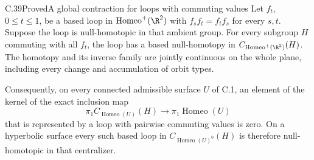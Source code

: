 \begin{claim}{C.39}{Proved}{A global contraction for loops with commuting values}
Let $f_t$, $0\leq t\leq1$, be a based loop in
$\operatorname{Homeo}^+(\R^2)$ with
$f_s f_t=f_t f_s$ for every $s,t$.
Suppose the loop is null-homotopic in that ambient group.
For every subgroup $H$ commuting with all $f_t$, the loop
has a based null-homotopy in
$C_{\operatorname{Homeo}^+(\R^2)}(H)$.
The homotopy and its inverse family are jointly continuous
on the whole plane, including every change and accumulation
of orbit types.

Consequently, on every connected admissible surface $U$
of C.1, an element of the kernel of the exact inclusion map
\[
 \pi_1 C_{\operatorname{Homeo}(U)}(H)
      \longrightarrow\pi_1\operatorname{Homeo}(U)
                                                        \tag{C.39.1}
\]
that is represented by a loop with pairwise commuting values
is zero. On a hyperbolic surface every such based loop in
$C_{\operatorname{Homeo}(U)^0}(H)$ is therefore null-homotopic
in that centralizer.
\end{claim}

